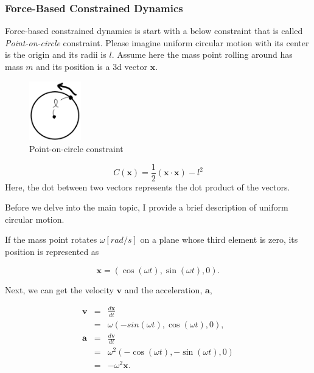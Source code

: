 \documentclass[pdflatex,sn-mathphys-num]{sn-jnl}%
\theoremstyle{thmstyleone}%
\theoremstyle{thmstyletwo}%
\theoremstyle{thmstylethree}%
\begin{document}
\subsubsection{Force-Based Constrained Dynamics}
\label{FBConstrained}
Force-based constrained dynamics is start with a below constraint that is called {\sl Point-on-circle} constraint. Please imagine uniform circular motion with its center is the origin and its radii is $l$. Assume here the mass point rolling around has mass $m$ and its position is a 3d vector $\boldsymbol{x}$. 

\begin{figure}[H]
	\centering
	\includegraphics[width=0.2\textwidth]{images/pocConstraint.png}
	\caption{Point-on-circle constraint}
	\label{pocConstraint}
\end{figure}

\begin{equation}
	C(\boldsymbol{x}) = \frac{1}{2}(\boldsymbol{x}\cdot\boldsymbol{x}) - l^2
\end{equation}
Here, the dot between two vectors represents the dot product of the vectors.

Before we delve into the main topic, I provide a brief description of uniform circular motion.

If the mass point rotates $\omega [rad/s]$ on a plane whose third element is zero, its position is represented as

\begin{equation}
	\boldsymbol{x} = (\cos(\omega t),\sin(\omega t), 0).
\end{equation}

Next, we can get the velocity $\boldsymbol{v}$ and the acceleration, $\boldsymbol{a}$,

\begin{eqnarray}
	\boldsymbol{v} &=& \frac{d\boldsymbol{x}}{dt}\nonumber\\
	&=& \omega(-sin(\omega t), \cos(\omega t), 0),\\
	\boldsymbol{a} &=& \frac{d\boldsymbol{v}}{dt}\nonumber\\
	&=& \omega^2(-\cos(\omega t), -\sin(\omega t), 0)\nonumber\\
	&=& -\omega^2\boldsymbol{x}.
\end{eqnarray}
\end{document}
